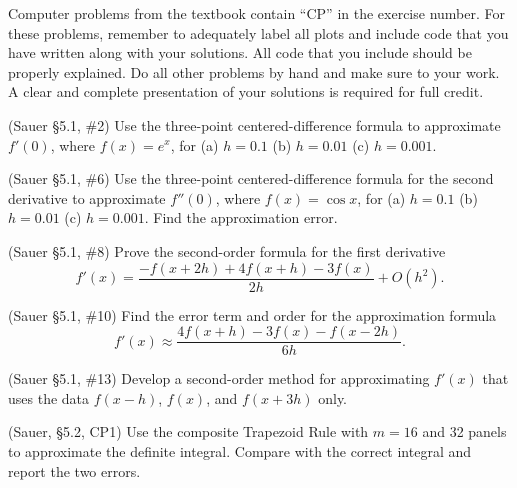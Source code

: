 \documentclass[12pt,fleqn]{exam}
\begin{document}
Computer problems from the textbook contain ``CP'' in the exercise number. For these problems, remember to adequately label all plots and include code that you have written along with your solutions. All code that you include should be properly explained. Do all other problems by hand and make sure to your work. A clear and complete presentation of your solutions is required for full credit.

\begin{questions}

\question (Sauer \S5.1, \#2) Use the three-point centered-difference formula to approximate $f'(0)$, where $f(x) = e^x$, for (a) $h = 0.1$ (b) $h = 0.01$ (c) $h = 0.001$.

\question (Sauer \S5.1, \#6) Use the three-point centered-difference formula for the second derivative to approximate $f''(0)$, where $f(x) = \cos x$, for (a) $h = 0.1$ (b) $h = 0.01$ (c) $h = 0.001$. Find the approximation error.

\question (Sauer \S5.1, \#8) Prove the second-order formula for the first derivative
\[f'(x) = \frac{-f(x+2h)+4f(x+h)-3f(x)}{2h} + O(h^2).\]

\question (Sauer \S5.1, \#10) Find the error term and order for the approximation formula
\[f'(x) \approx \frac{4f(x+h)-3f(x)-f(x-2h)}{6h}.\]

\question (Sauer \S5.1, \#13) Develop a second-order method for approximating $f'(x)$ that uses the data $f(x-h)$, $f(x)$, and $f(x+3h)$ only.

\question (Sauer, \S5.2, CP1) Use the composite Trapezoid Rule with $m = 16$ and 32 panels to approximate the definite integral. Compare with the correct integral and report the two errors.

\end{questions}
\end{document}
